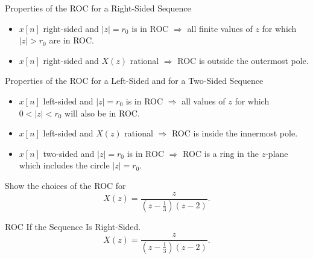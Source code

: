 \begin{frame}{Properties of the ROC for a Right-Sided Sequence}
    \begin{itemize}
      \item $x[n]$ right-sided and $|z| = r_0$ is in ROC $\Rightarrow$ all finite values of $z$ for which $|z| > r_0$ are in ROC.
      \item $x[n]$ right-sided and $X(z)$ rational $\Rightarrow$ ROC is outside the outermost pole.
    \end{itemize}
\end{frame}

\begin{frame}{Properties of the ROC for a Left-Sided and for a Two-Sided Sequence}
    \begin{itemize}
      \item $x[n]$ left-sided and $|z| = r_0$ is in ROC $\Rightarrow$ all  values of $z$ for which $0 < |z| < r_0$ will also be in ROC.
      \item $x[n]$ left-sided and $X(z)$ rational $\Rightarrow$ ROC is inside  the innermost pole.
      \item $x[n]$ two-sided and $|z| = r_0$ is in ROC $\Rightarrow$ ROC is a ring in the  $z$-plane which includes the circle $|z|= r_0$.
    \end{itemize}
\end{frame}

\begin{frame}
    \begin{example}
        Show the choices of the ROC for
        \begin{equation*}
            X(z) = \frac{z}{\left(z - \frac{1}{3}\right)\left(z-2\right)}.
        \end{equation*}
    \end{example}
\end{frame}

\begin{frame}{ROC If the Sequence Is Right-Sided.}
    \begin{equation*}
        X(z) = \frac{z}{\left(z - \frac{1}{3}\right)\left(z-2\right)}.
    \end{equation*}
    {
        \begin{center}
            
        \end{center}
    }
\end{frame}

